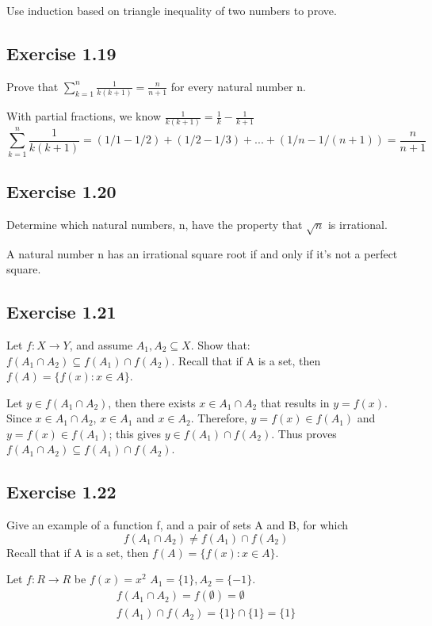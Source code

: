 \documentclass[12pt]{article}
\begin{document}
				Use induction based on triangle inequality of two numbers to prove.
				
		\subsection*{Exercise 1.19}
			Prove that $\sum_{k=1}^{n}\frac{1}{k(k+1)} = \frac{n}{n+1}$ for every natural number n.
			
				With partial fractions, we know $\frac{1}{k(k+1)} = \frac{1}{k} - \frac{1}{k+1}$
				\begin{equation}
					\sum_{k=1}^{n}\frac{1}{k(k+1)} = (1/1-1/2) + (1/2-1/3) + ... + (1/n - 1/(n+1)) = \frac{n}{n+1}
				\end{equation}
		\subsection*{Exercise 1.20}
			Determine which natural numbers, n, have the property that $\sqrt{n}$ is irrational.
			
			A natural number n has an irrational square root if and only if it's not a perfect square.
			
		\subsection*{Exercise 1.21}
			Let $f:X \rightarrow Y$, and assume $A_1, A_2 \subseteq X$. Show that: $f(A_1 \cap A_2) \subseteq f(A_1) \cap f(A_2)$. Recall that if A is a set, then $f(A) = \{f(x):x \in A\}$.
			
			Let $y \in f(A_1 \cap A_2)$, then there exists $x \in A_1 \cap A_2$ that results in $y = f(x)$. Since $x \in A_1 \cap A_2$, $x \in A_1$ and $x \in A_2$. Therefore, $y = f(x) \in f(A_1)$ and $y = f(x) \in f(A_1)$; this gives $y \in f(A_1) \cap f(A_2)$. Thus proves $f(A_1 \cap A_2) \subseteq f(A_1) \cap f(A_2)$.
		\subsection*{Exercise 1.22}
			Give an example of a function f, and a pair of sets A and B, for which
			\begin{equation}
				f(A_1 \cap A_2) \ne f(A_1) \cap f(A_2)
			\end{equation}
			Recall that if A is a set, then $f(A) = \{f(x):x \in A\}$.
			
			Let $f:R \rightarrow R$ be $f(x) = x^2$
			$A_1 = \{1\}, A_2 = \{-1\}$.
			\begin{equation}
				\begin{split}
					f(A_1 \cap A_2) = f(\emptyset) = \emptyset \\
					f(A_1) \cap f(A_2) = \{1\} \cap \{1\} = \{1\}
				\end{split}
			\end{equation}
\end{document}
